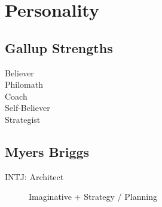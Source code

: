 \documentclass[10pt, a4paper, twocolumn]{article}
\begin{document}
%

\vfill\eject


\section*{Personality}

\subsection*{Gallup Strengths}
\begin{description}
 \item [Believer]
 \item [Philomath]
 \item [Coach]
 \item [Self-Believer]
 \item [Strategist]
\end{description}



\subsection*{Myers Briggs}
\begin{description}

 \item[INTJ: Architect] %
 \item[] Imaginative + Strategy / Planning
\end{description}
\end{document}
